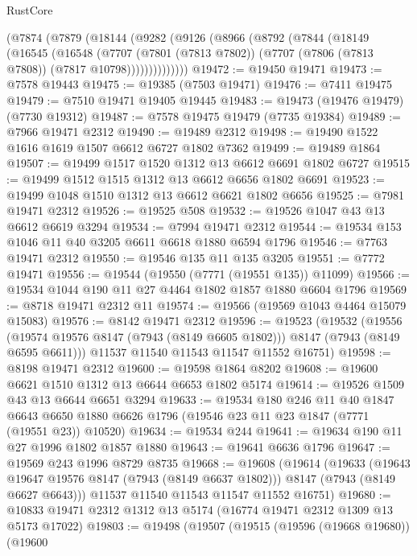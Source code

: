\begin{lexlean}{RustCore}
\begin{coremodule}
    (@7874
      (@7879
        (@18144
          (@9282
            (@9126
              (@8966
                (@8792
                  (@7844
                    (@18149
                      (@16545
                        (@16548
                          (@7707
                            (@7801 (@7813 @7802))
                            (@7707 (@7806 (@7813 @7808)) (@7817 @10798))))))))))))))
@19472 := @19450 @19471
@19473 := @7578 @19443
@19475 := @19385 (@7503 @19471)
@19476 := @7411 @19475
@19479 := @7510 @19471 @19405 @19445
@19483 := @19473 (@19476 @19479) (@7730 @19312)
@19487 := @7578 @19475 @19479 (@7735 @19384)
@19489 := @7966 @19471 @2312
@19490 := @19489 @2312
@19498 := @19490 @1522 @1616 @1619 @1507 @6612 @6727 @1802 @7362
@19499 := @19489 @1864
@19507 := @19499 @1517 @1520 @1312 @13 @6612 @6691 @1802 @6727
@19515 := @19499 @1512 @1515 @1312 @13 @6612 @6656 @1802 @6691
@19523 := @19499 @1048 @1510 @1312 @13 @6612 @6621 @1802 @6656
@19525 := @7981 @19471 @2312
@19526 := @19525 @508
@19532 := @19526 @1047 @43 @13 @6612 @6619 @3294
@19534 := @7994 @19471 @2312
@19544 := @19534 @153 @1046 @11 @40 @3205 @6611 @6618 @1880 @6594 @1796
@19546 := @7763 @19471 @2312
@19550 := @19546 @135 @11 @135 @3205
@19551 := @7772 @19471
@19556 := @19544 (@19550 (@7771 (@19551 @135)) @11099)
@19566 := @19534 @1044 @190 @11 @27 @4464 @1802 @1857 @1880 @6604 @1796
@19569 := @8718 @19471 @2312 @11
@19574 := @19566 (@19569 @1043 @4464 @15079 @15083)
@19576 := @8142 @19471 @2312
@19596 := @19523
    (@19532
      (@19556 (@19574 @19576 @8147 (@7943 (@8149 @6605 @1802))) @8147 (@7943 (@8149 @6595 @6611)))
      @11537
      @11540
      @11543
      @11547
      @11552
      @16751)
@19598 := @8198 @19471 @2312
@19600 := @19598 @1864 @8202
@19608 := @19600 @6621 @1510 @1312 @13 @6644 @6653 @1802 @5174
@19614 := @19526 @1509 @43 @13 @6644 @6651 @3294
@19633 := @19534
    @180
    @246
    @11
    @40
    @1847
    @6643
    @6650
    @1880
    @6626
    @1796
    (@19546 @23 @11 @23 @1847 (@7771 (@19551 @23)) @10520)
@19634 := @19534 @244
@19641 := @19634 @190 @11 @27 @1996 @1802 @1857 @1880
@19643 := @19641 @6636 @1796
@19647 := @19569 @243 @1996 @8729 @8735
@19668 := @19608
    (@19614
      (@19633
        (@19643 @19647 @19576 @8147 (@7943 (@8149 @6637 @1802)))
        @8147
        (@7943 (@8149 @6627 @6643)))
      @11537
      @11540
      @11543
      @11547
      @11552
      @16751)
@19680 := @10833 @19471 @2312 @1312 @13 @5174 (@16774 @19471 @2312 @1309 @13 @5173 @17022)
@19803 := @19498
    (@19507
      (@19515
        (@19596 (@19668 @19680))
        (@19600

\end{coremodule}
\end{lexlean}
